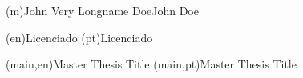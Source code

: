 
%



\ncauthorname(m){John Very Longname Doe}{John Doe}


\ncauthordegree(en){Licenciado} 
\ncauthordegree(pt){Licenciado}




\nctitle(main,en){Master Thesis Title}%
\nctitle(main,pt){Master Thesis Title}%

